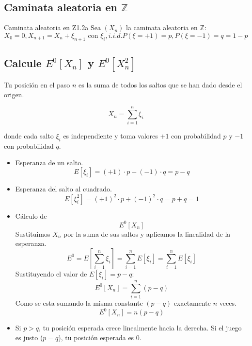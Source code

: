 \documentclass[10pt,a4paper]{article}
\begin{document}
\newpage

\subsection{Caminata aleatoria en $\mathbb{Z}$}

\begin{ejercicio}{Caminata aleatoria en Z}{1.2a}
    Sea \( (X_n)\) la caminata aleatoria en $\mathbb{Z:}$
    \[ X_{0}=0, X_{n+1} = X_n + \xi _{n+1} \text{ con $\xi_{i}, i.i.d. $} P(\xi = +1) =p , P(\xi=-1 )=q = 1-p \]
\end{ejercicio}

\subsection*{Calcule $E^{0}[X_n] $ y $E^{0}[X^{2}_{n}]$}

\begin{alerta}{}

    Tu posición en el paso $n$ es la suma de todos los saltos que se han dado desde el origen.

    \[ X_{n} = \sum_{i=1}^{n} \xi_i \]
    
    donde cada salto $\xi_i$ es independiente y toma valores $+1 $ con probabilidad $p$ y $-1$ con probabilidad $q$.
\end{alerta}

\begin{itemize}
    \item Esperanza de un salto.
    \[ E[\xi_i] = (+1) \cdot p + (-1) \cdot q = p - q \]
    \item Esperanza del salto al cuadrado.
    \[ E[\xi_i^2] = (+1)^2 \cdot p + (-1)^2 \cdot q = p + q = 1 \]
\end{itemize}

\vspace{5mm}

\begin{itemize}
    \item Cálculo de \[ E^{0}[X_n] \] Sustituimos $X_{n}$ por la suma de sus saltos y aplicamos la linealidad de la esperanza.
    \[ E^{0}= E[\sum_{i=1}^{n} \xi_i] = \sum_{i=1}^{n} E[\xi_i] = \sum_{i=1}^{n} E[\xi_{i}] \]
    Sustituyendo el valor de $E[\xi_i] = p-q$:
    \[ E^{0}[X_n] = \sum_{i=1}^{n} (p - q) \]
    Como se esta sumando la misma constante $(p-q)$ exactamente $n$ veces.
    \[ E^{0}[X_n] = n(p - q) \]
    \item  Si $p > q$, tu posición esperada crece linealmente hacia la derecha. Si el juego es justo ($p=q$), tu posición esperada es $0$.
\end{itemize}
\end{document}
